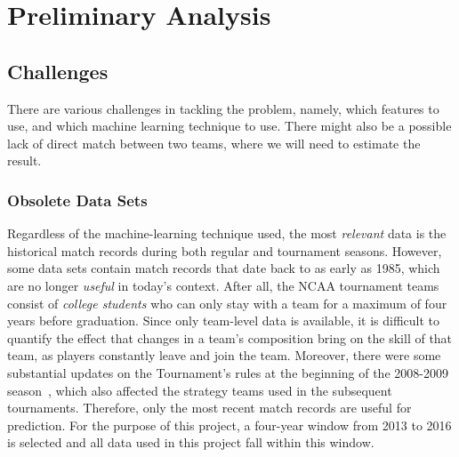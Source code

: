 \chapter{Preliminary Analysis}\label{Chap:2}

\section{Challenges}

There are various challenges in tackling the problem, namely, which features to use, and which machine learning technique to use. There might also be a possible lack of direct match between two teams, where we will need to estimate the result.

%

\subsection{Obsolete Data Sets}

Regardless of the machine-learning technique used, the most \emph{relevant} data is the historical match records during both regular and tournament seasons. However, some data sets contain match records that date back to as early as 1985, which are no longer \emph{useful} in today's context. After all, the NCAA tournament teams consist of \emph{college students} who can only stay with a team for a maximum of four years before graduation. Since only team-level data is available, it is difficult to quantify the effect that changes in a team's composition bring on the skill of that team, as players constantly leave and join the team. Moreover, there were some substantial updates on the Tournament's rules at the beginning of the 2008-2009 season~\cite{NP15}, which also affected the strategy teams used in the subsequent tournaments. Therefore, only the most recent match records are useful for prediction. For the purpose of this project, a four-year window from 2013 to 2016 is selected and all data used in this project fall within this window. 

